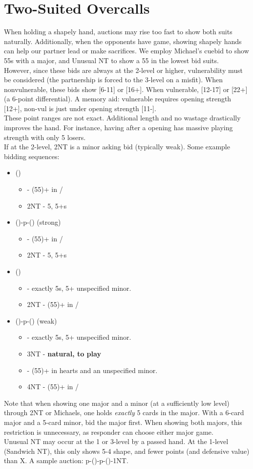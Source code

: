 \documentclass[12pt]{report}
\newcommand{\n}{\\}
\newcommand{\ul}[1]{\begin{itemize}#1\end{itemize}}
\newcommand{\li}{\item[~]}
\begin{document}
\section{Two-Suited Overcalls} \label{4:6}

    When holding a shapely hand, auctions may rise too fast to show both suits naturally.  Additionally, when the opponents have game, showing shapely hands can help our partner lead or make sacrifices.  We employ Michael's cuebid to show 55s with a major, and Unusual NT to show a 55 in the lowest bid suits. \n

    However, since these bids are always at the 2-level or higher, vulnerability must be considered (the partnership is forced to the 3-level on a misfit).  When nonvulnerable, these bids show [6-11] or [16+].  When vulnerable, [12-17] or [22+] (a 6-point differential).  A memory aid: vulnerable requires opening strength [12+], non-vul is just under opening strength [11-]. \n
    
    These point ranges are not exact.  Additional length and no wastage drastically improves the hand.  For instance, having   \di{}  after a  opening has massive playing strength with only 5 losers.\n
    
    If at the 2-level, 2NT is a minor asking bid (typically weak).  Some example bidding sequences:

    \ul {
        \li ()
        \ul {
            \li {} - (55)+ in \he{}/\sp{}
            \li 2NT - 5\he{}, 5+\di{}s
        }
        \li (\di1)-p-(\di2) (strong)
        \ul {
            \li \di3 - (55)+ in \he{}/\sp{}
            \li 2NT - 5\he{}, 5+\cl{}s
        }
        \li (\he1)
        \ul {
            \li \sp2 - exactly 5\sp{}s, 5+ unspecified minor.
            \li 2NT - (55)+ in \cl{}/\di{}
        }
        \li (\sp1)-p-(\sp3) (weak)
        \ul {
            \li \sp2 - exactly 5\he{}s, 5+ unspecified minor.
            \li 3NT - \textbf{natural, to play}
            \li \sp4 - (55)+ in hearts and an unspecified minor.
            \li 4NT - (55)+ in \cl{}/\di{}
        }
    }

    Note that when showing one major and a minor (at a sufficiently low level) through 2NT or Michaels, one holds \textit{exactly} 5 cards in the major.  With a 6-card major and a 5-card minor, bid the major first.  When showing both majors, this restriction is unnecessary, as responder can choose either major game. \n

    Unusual NT may occur at the 1 or 3-level by a passed hand.  At the 1-level (Sandwich NT), this only shows 5-4 shape, and fewer points (and defensive value) than X.  A sample auction: p-()-p-()-1NT.
\end{document}
